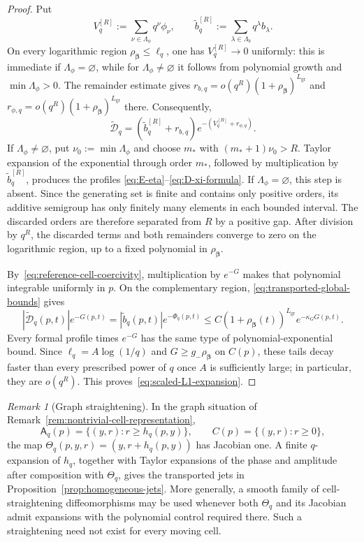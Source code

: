 \documentclass[11pt]{amsart}
\numberwithin{equation}{section}
\theoremstyle{definition}
\theoremstyle{remark}
\newtheorem{remark}[theorem]{Remark}
\newcommand{\cD}{\mathcal{D}}
\newcommand{\Afib}{\mathsf{A}}
\begin{document}
\begin{proof}
Put
\[
 V_q^{[R]}:=\sum_{\nu\in\Lambda_\phi}q^\nu\phi_\nu,
 \qquad
 \widetilde b_q^{[R]}:=\sum_{\lambda\in\Lambda_b}q^\lambda b_\lambda.
\]
On every logarithmic region $\rho_{\bm\beta}\le \ell_q$, one has
$V_q^{[R]}\to0$ uniformly: this is immediate if $\Lambda_\phi=\varnothing$, while
for $\Lambda_\phi\ne\varnothing$ it follows from polynomial growth and
$\min\Lambda_\phi>0$.  The remainder estimate gives
$r_{b,q}=o(q^R)(1+\rho_{\bm\beta})^{L_{\mathrm{gr}}}$ and
$r_{\phi,q}=o(q^R)(1+\rho_{\bm\beta})^{L_{\mathrm{gr}}}$ there.  Consequently,
\[
 \widetilde{\cD}_q=(\widetilde b_q^{[R]}+r_{b,q})e^{-(V_q^{[R]}+r_{\phi,q})}.
\]
If $\Lambda_\phi\ne\varnothing$, put
$\nu_0:=\min\Lambda_\phi$ and choose $m_*$ with
$(m_*+1)\nu_0>R$.  Taylor expansion of the exponential through order $m_*$,
followed by multiplication by $\widetilde b_q^{[R]}$, produces the profiles
\eqref{eq:E-eta}--\eqref{eq:D-xi-formula}.  If
$\Lambda_\phi=\varnothing$, this step is absent.  Since the generating set is
finite and contains only positive orders, its additive semigroup has only
finitely many elements in each bounded interval.  The discarded orders are
therefore separated from $R$ by a positive gap.  After division by $q^R$, the
discarded terms and both remainders converge to zero on the logarithmic region,
up to a fixed polynomial in $\rho_{\bm\beta}$.

By~\eqref{eq:reference-cell-coercivity}, multiplication by $e^{-G}$ makes that
polynomial integrable uniformly in $p$.  On the complementary region,
\eqref{eq:transported-global-bounds} gives
\[
 |\widetilde{\cD}_q(p,t)|e^{-G(p,t)}
 =|\widetilde b_q(p,t)|e^{-\Phi_q(p,t)}
 \le C(1+\rho_{\bm\beta}(t))^{L_{\mathrm{gr}}} e^{-\kappa_G G(p,t)}.
\]
Every formal profile times $e^{-G}$ has the same type of
polynomial-exponential bound.  Since $\ell_q=A\log(1/q)$ and
$G\ge g_-\rho_{\bm\beta}$ on $C(p)$, these tails decay faster than every
prescribed power of $q$ once $A$ is sufficiently large; in particular, they
are $o(q^R)$.  This proves~\eqref{eq:scaled-L1-expansion}.
\end{proof}

\begin{remark}[Graph straightening]\label{rem:moving-boundary-straightening}
In the graph situation of Remark~\ref{rem:nontrivial-cell-representation},
\[
 \Afib_q(p)=\{(y,r):r\ge h_q(p,y)\},
 \qquad C(p)=\{(y,r):r\ge0\},
\]
the map $\Theta_q(p,y,r)=(y,r+h_q(p,y))$ has Jacobian one.  A finite
$q$-expansion of $h_q$, together with Taylor expansions of the phase and
amplitude after composition with $\Theta_q$, gives the transported jets in
Proposition~\ref{prop:homogeneous-jets}.  More generally, a smooth family of
cell-straightening diffeomorphisms may be used whenever both $\Theta_q$ and its
Jacobian admit expansions with the polynomial control required there.  Such a
straightening need not exist for every moving cell.
\end{remark}
\end{document}
